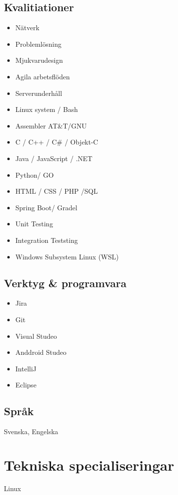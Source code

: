 \documentclass{article}
\begin{document}
\begin{minipage}[t]{0.28\textwidth}
\subsection*{\textcolor{colorBlue}{Kvalitiationer}}
\begin{itemize}
  \item Nätverk
  \item Problemlösning
  \item Mjukvarudesign
  \item Agila arbetsflöden
  \item Serverunderhåll
  \item Linux system / Bash
  \item Assembler AT\&T/GNU
  \item C / C++ / C\# / Objekt-C
  \item Java / JavaScript / .NET
  \item Python/ GO
  \item HTML / CSS / PHP /SQL
  \item Spring Boot/ Gradel
  \item Unit Testing
  \item Integration Teststing
  \item Windows Subsystem Linux (WSL)
\end{itemize}
\vspace{-10pt} %
\subsection*{\textcolor{colorBlue}{Verktyg \& programvara}}
\begin{itemize}
  \item Jira
  \item Git
  \item Visual Studeo
  \item Anddroid Studeo
  \item IntelliJ
  \item Eclipse
\end{itemize}
\vspace{-10pt} %
\subsection*{\textcolor{colorBlue}{Språk}}
Svenska, Engelska
\end{minipage}
\begin{minipage}[t]{0.4\textwidth}

\section*{\textcolor{colorBlue}{Tekniska specialiseringar}}
Linux

\end{minipage}%
\end{document}
